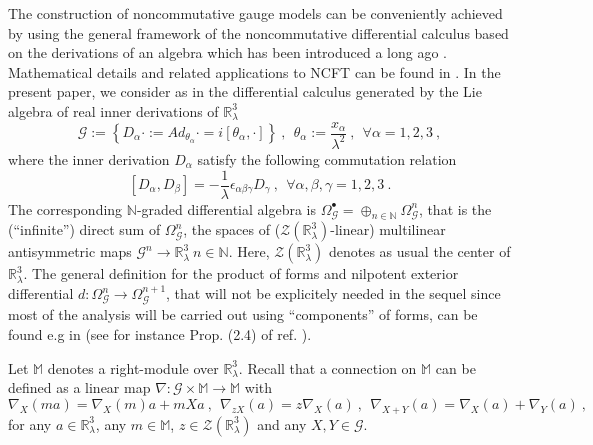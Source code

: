 \documentclass[a4paper,11pt,twoside]{article}
\numberwithin{equation}{section}
\theoremstyle{nonumberplain}
\newcounter{and}
\begin{document}
The construction of noncommutative gauge models can be conveniently achieved by using the general framework of the noncommutative differential calculus based on the derivations of an algebra which has been introduced a long ago \cite{mdv88-99}. Mathematical details and related applications to NCFT can be found in \cite{cgmw-20}. In the present paper, we consider as in \cite{gervitwal-13} the differential calculus generated by the Lie algebra of real inner derivations of $\mathbb{R}^3_\lambda$%
%
\begin{equation}
\mathcal{G} := \left\{D_\alpha \cdot := Ad_{\theta_\alpha} \cdot = i \left[\theta_\alpha, \cdot\right]\right\} \ ,  \ \ \theta_\alpha := \frac{x_\alpha}{\lambda^2} \ , \ \ \forall \alpha = 1,2,3 \ , \label{inv-form-conn}
\end{equation}
%
where the inner derivation $D_\alpha$ satisfy the following commutation relation%
%
\begin{equation}
\left[D_\alpha,D_\beta\right] = -\frac{1}{\lambda} \epsilon_{\alpha\beta\gamma} D_\gamma \ , \ \ \forall \alpha,\beta,\gamma = 1,2,3 \ . \label{Der}
\end{equation}
%
The corresponding $\mathbb{N}$-graded differential algebra is $\Omega_\mathcal{G}^\bullet = \oplus_{n\in\mathbb{N}} \Omega^n_\mathcal{G}$, that is the (``infinite'') direct sum of $\Omega^n_\mathcal{G}$, the spaces of ($\mathcal{Z}(\mathbb{R}^3_\lambda)$-linear) multilinear antisymmetric maps $\mathcal{G}^n\to\mathbb{R}^3_\lambda \ n \in \mathbb{N}$. Here, $\mathcal{Z}(\mathbb{R}^3_\lambda)$ denotes as usual the center of $\mathbb{R}^3_\lambda$. The general definition for the product of forms and nilpotent exterior differential $d:\Omega^n_\mathcal{G}\to\Omega^{n+1}_\mathcal{G}$, that will not be explicitely needed in the sequel since most of the analysis will be carried out using ``components'' of forms, can be found e.g in \cite{cgmw-20} (see for instance Prop. (2.4) of ref. \cite{cgmw-20}). \par%
%
Let $\mathbb{M}$ denotes a right-module over $\mathbb{R}^3_\lambda$. Recall that a connection on $\mathbb{M}$ can be defined as a linear map $\nabla:\mathcal{G}\times\mathbb{M}\to\mathbb{M}$ with%
%
\begin{equation*}
\nabla_X(ma) = \nabla_X(m)a + mXa \ , \ \ \nabla_{zX}(a)=z\nabla_X(a) \ , \ \ \nabla_{X+Y}(a)=\nabla_X(a)+\nabla_Y(a) \ ,
\end{equation*}
%
for any $a\in\mathbb{R}^3_\lambda$, any $m\in\mathbb{M}$, $z\in \mathcal{Z}(\mathbb{R}^3_\lambda)$ and any $X,Y\in\mathcal{G}$.\par%
\end{document}
